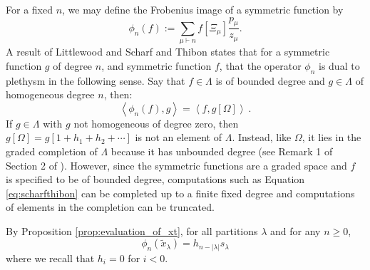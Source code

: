 \documentclass{amsart}
\theoremstyle{definition}
\newcommand{\xt}{\tilde x}
\newcommand{\rosa}[1]{\todo[size=\tiny,color=cyan]{#1 \\ \hfill --- Rosa}}
\begin{document}

For a fixed $n$, we may define the Frobenius image of a symmetric function by
\[
\phi_n( f) := \sum_{\mu \vdash n} f[\Xi_\mu] \frac{p_\mu}{z_\mu}.
\]
A result of Littlewood \cite{Littlewood} and Scharf and Thibon \cite[Theorem 5.1]{ST} states that for a symmetric function
$g$ of degree $n$, and symmetric function $f$, that the operator $\phi_n$ is dual to
plethysm in the following sense.  Say that $f \in \Lambda$ is of bounded degree and $g \in \Lambda$ of
homogeneous degree $n$, then:
\begin{equation}\label{eq:scharfthibon}
\left< \phi_n(f), g \right> = \left< f, g[\Omega ]\right>~.
\end{equation}
If $g \in \Lambda$ with $g$ not homogeneous of degree zero, then
$g[\Omega] = g[1 + h_1 + h_2 + \cdots]$ is not an element of $\Lambda$. Instead, like
$\Omega$, it lies in the graded completion of $\Lambda$
because it has unbounded degree (see Remark 1 of Section 2 of \cite{Macdonald}).
However, since the symmetric functions are a graded space and $f$ is specified to be
of bounded degree,
computations such as Equation \eqref{eq:scharfthibon} can be completed
up to a finite fixed degree and computations of elements in the completion can be truncated.

By Proposition \ref{prop:evaluation_of_xt},
for all partitions $\lambda$ and for any $n\geq0$,
\begin{equation}\label{eq:frob_image_xt}
\phi_n(\xt_\lambda) = h_{n-|\lambda|} s_\lambda
\end{equation}
where we recall that $h_i=0$ for $i<0$.
\end{document}
